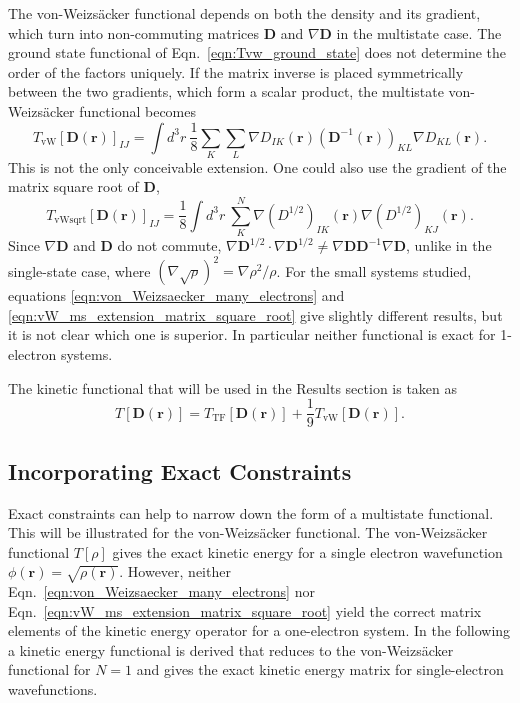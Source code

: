 \documentclass[journal=jpclcd,manuscript=letter]{achemso}
\newcommand\m[1]{\mathbf{#1}}
\renewcommand\vec[1]{\mathbf{#1}}
\begin{document}
The von-Weizs\"{a}cker functional depends on both the density and its gradient,
which turn into non-commuting matrices $\m{D}$ and $\nabla \m{D}$ in the multistate case.
The ground state functional of Eqn.~\ref{eqn:Tvw_ground_state} does not determine the order of the factors uniquely.
If the matrix inverse is placed symmetrically between the two gradients, which form a scalar product, the
multistate von-Weizs\"{a}cker functional becomes
\begin{equation}
  T_{\text{vW}}[\m{D}(\vec{r})]_{IJ} = \int d^3\!r ~ \frac{1}{8} \sum_{K} \sum_{L} \nabla D_{IK}(\vec{r}) \left(\m{D}^{-1}(\vec{r}) \right)_{KL} \nabla D_{KL}(\vec{r}).
  \label{eqn:von_Weizsaecker_many_electrons}
\end{equation}
This is not the only conceivable extension. One could also use the gradient of the matrix square root of $\m{D}$,
\begin{equation}
T_{\text{vWsqrt}}[\m{D}(\vec{r})]_{IJ} 
= \frac{1}{8} \int d^3\!r ~ \sum_{K}^N \nabla (D^{1/2})_{IK}(\vec{r}) \nabla (D^{1/2})_{KJ}(\vec{r}).
\label{eqn:vW_ms_extension_matrix_square_root}
\end{equation}
Since $\nabla \m{D}$ and $\m{D}$ do not commute,
$\nabla \m{D}^{1/2} \cdot \nabla \m{D}^{1/2} \neq \nabla \m{D} \m{D}^{-1} \nabla \m{D}$,
unlike in the single-state case, where $\left(\nabla \sqrt{\rho}\right)^2 = \nabla \rho^2 / \rho$.
For the small systems studied, equations \ref{eqn:von_Weizsaecker_many_electrons} and \ref{eqn:vW_ms_extension_matrix_square_root}
give slightly different results, but it is not clear which one is superior.
In particular neither functional is exact for 1-electron systems.

The kinetic functional that will be used in the Results section is taken as
\begin{equation}
T[\m{D}(\vec{r})] = T_{\text{TF}}[\m{D}(\vec{r})] + \frac{1}{9} T_{\text{vW}}[\m{D}(\vec{r})]. \label{eqn:kinetic_energy_msdft}
\end{equation}

\subsection{Incorporating Exact Constraints}
\label{sec:exact_constraints}
Exact constraints can help to narrow down the form of a multistate functional.
This will be illustrated for the von-Weizs\"{a}cker functional.
The von-Weizs\"{a}cker functional $T[\rho]$ gives the exact kinetic energy for a single electron wavefunction $\phi(\vec{r}) = \sqrt{\rho(\vec{r})}$.
However, neither Eqn.~\ref{eqn:von_Weizsaecker_many_electrons} nor Eqn.~\ref{eqn:vW_ms_extension_matrix_square_root} yield the correct
matrix elements of the kinetic energy operator for a one-electron system.
In the following a kinetic energy functional is derived that reduces to the von-Weizs\"{a}cker functional for $N=1$ and gives the
exact kinetic energy matrix for single-electron wavefunctions.
\end{document}

